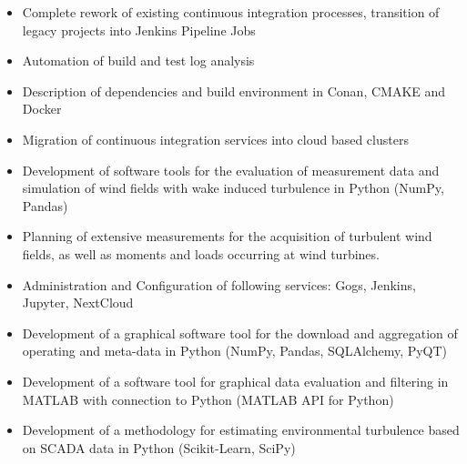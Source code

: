 \documentclass[10pt,a4paper,ragged2e,normalphoto]{altacv}
\begin{document}

  \begin{fullwidth}
    \makecvheader
  \end{fullwidth}

      \begin{itemize}
        \item Complete rework of existing continuous integration processes, transition of legacy projects into Jenkins Pipeline Jobs \\
        \item Automation of build and test log analysis \\
        \item Description of dependencies and build environment in Conan, CMAKE and Docker \\
        \item Migration of continuous integration services into cloud based clusters \\
      \end{itemize}
    \divider

      \begin{itemize}
        \item Development of software tools for the evaluation of measurement data and simulation of wind fields with wake induced turbulence in Python (NumPy, Pandas) \\
        \item Planning of extensive measurements for the acquisition of turbulent wind fields, as well as moments and loads occurring at wind turbines. \\
        \item Administration and Configuration of following services: Gogs, Jenkins, Jupyter, NextCloud \\
      \end{itemize}
    \divider

      \begin{itemize}
        \item Development of a graphical software tool for the download and aggregation of operating and meta-data in Python (NumPy, Pandas, SQLAlchemy, PyQT) \\
        \item Development of a software tool for graphical data evaluation and filtering in MATLAB with connection to Python (MATLAB API for Python) \\
        \item Development of a methodology for estimating environmental turbulence based on SCADA data in Python (Scikit-Learn, SciPy) \\
      \end{itemize}
\end{document}
